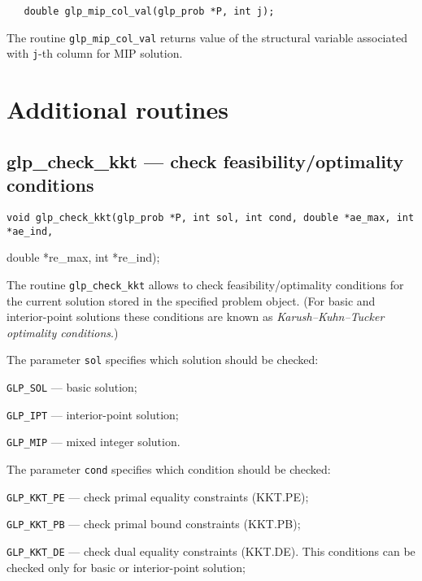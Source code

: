 \synopsis

\begin{verbatim}
   double glp_mip_col_val(glp_prob *P, int j);
\end{verbatim}

\returns

The routine \verb|glp_mip_col_val| returns value of the structural
variable associated with \verb|j|-th column for MIP solution.


\newpage

\section{Additional routines}

\subsection{glp\_check\_kkt --- check feasibility/optimality
conditions}

\synopsis

{\parskip=0pt
\tt void glp\_check\_kkt(glp\_prob *P, int sol, int cond,
double *ae\_max, int *ae\_ind,

\hspace{105pt}double *re\_max, int *re\_ind);}

\description

The routine \verb|glp_check_kkt| allows to check
feasibility/optimality conditions for the current solution stored in
the specified problem object. (For basic and interior-point solutions
these conditions are known as {\it Karush--Kuhn--Tucker optimality
conditions}.)

The parameter \verb|sol| specifies which solution should be checked:

\verb|GLP_SOL| --- basic solution;

\verb|GLP_IPT| --- interior-point solution;

\verb|GLP_MIP| --- mixed integer solution.

The parameter \verb|cond| specifies which condition should be checked:

\verb|GLP_KKT_PE| --- check primal equality constraints (KKT.PE);

\verb|GLP_KKT_PB| --- check primal bound constraints (KKT.PB);

\verb|GLP_KKT_DE| --- check dual equality constraints (KKT.DE). This
conditions can be checked only for basic or interior-point solution;

